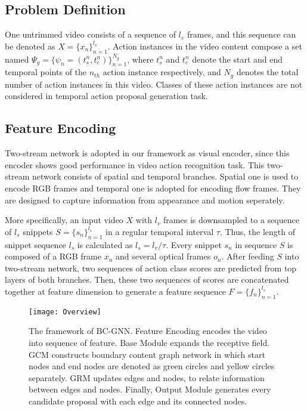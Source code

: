 \documentclass[runningheads]{llncs}
\begin{document}
\subsection{Problem Definition}
One untrimmed video consists of a sequence of $l_v$ frames, and this sequence can be denoted as $X={\{x_n\}}^{l_v}_{n=1} $. Action instances in the video content compose a set named $\Psi_g = \{\psi_n = (t_{s}^n,t_{e}^n)\}^{N_g}_{n=1}$, where $t_{s}^n$ and $t_{e}^n$ denote the start and end temporal points of the $n_{th}$  action instance respectively, and $N_g$ denotes the total number of action instances in this video. Classes of these action instances are not considered in temporal action proposal generation task. 

\subsection{Feature Encoding}
Two-stream network \cite{two-stream} is adopted in our framework as visual encoder, since this encoder shows good performance in video action recognition task. This two-stream network consists of spatial and temporal branches. Spatial one is used to encode RGB frames and temporal one is adopted for encoding flow frames. They are designed to capture information from appearance and motion seperately.

More specifically, an input video $X$ with $l_v$ frames is downsampled to a sequence of $l_s$ snippets $S = \{s_n\}_{n=1}^{l_s}$ in a regular temporal interval $\tau$. Thus, the length of snippet sequence $l_s$ is calculated as $l_s = l_v / \tau$. Every snippet $s_n$ in sequence $S$ is composed of a RGB frame $x_n$ and several optical frames $o_n$. After feeding $S$ into two-stream network, two sequences of action class scores are predicted from top layers of both branches. Then, these two sequences of scores are concatenated together at feature dimension to generate a feature sequence $F=\{f_n\}_{n=1}^{l_s}$.

\begin{figure}
\setlength{\belowcaptionskip}{0cm}
\setlength{\abovecaptionskip}{0.3cm}
\centering
\texttt{[image: Overview]}
\caption{The framework of BC-GNN. Feature Encoding encodes the video into sequence of feature. Base Module expands the receptive field. GCM constructs boundary content graph network in which start nodes and end nodes are denoted as green circles and yellow circles separately. GRM updates edges and nodes, to relate information between edges and nodes. Finally, Output Module generates every candidate proposal with each edge and its connected nodes.    }
\label{overview}
\end{figure}
\end{document}
